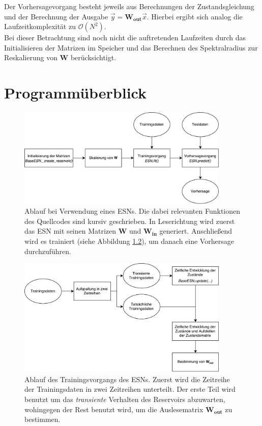 \begin{appendices}
Der Vorhersagevorgang besteht jeweils aus Berechnungen der Zustandsgleichung und der  Berechnung der Ausgabe $\vec{y} = \mathbf{W_{out}} \vec{x}$. Hierbei ergibt sich analog die Laufzeitkomplexität zu $\mathcal{O}(N^2)$.\\

Bei dieser Betrachtung sind noch nicht die auftretenden Laufzeiten durch das Initialisieren der Matrizen im Speicher und das Berechnen des Spektralradius zur Reskalierung von $\mathbf{W}$ berücksichtigt. 

\chapter{Programmüberblick}

\begin{figure}[h]
	\centering
	\includegraphics[width=0.9\textwidth]{figures/illustrations/esn_flow_chart.pdf}
  	\caption{Ablauf bei Verwendung eines \textsc{ESN}s. Die dabei relevanten Funktionen des Quellcodes sind kursiv geschrieben. In Leserichtung wird zuerst das \textsc{ESN} mit seinen Matrizen $\mathbf{W}$ und $\mathbf{W_{in}}$ generiert. Anschließend wird es trainiert (siehe Abbildung \ref{fig:apx_esn_training_flowchart}), um danach eine Vorhersage durchzuführen.}
  	  \label{fig:apx_esn_flowchart}
\end{figure}%

\begin{figure}[h]
	\centering
	\includegraphics[width=0.9\textwidth]{figures/illustrations/esn_training_flow_chart.pdf}
  	\caption{Ablauf des Trainingsvorgangs des \textsc{ESN}s. Zuerst wird die Zeitreihe der Trainingsdaten in zwei Zeitreihen unterteilt. Der erste Teil wird benutzt um das \textit{transiente} Verhalten des Reservoirs abzuwarten, wohingegen der Rest benutzt wird, um die Auslesematrix $\mathbf{W_{out}}$ zu bestimmen.}
  	\label{fig:apx_esn_training_flowchart}
\end{figure}%


\end{appendices}
